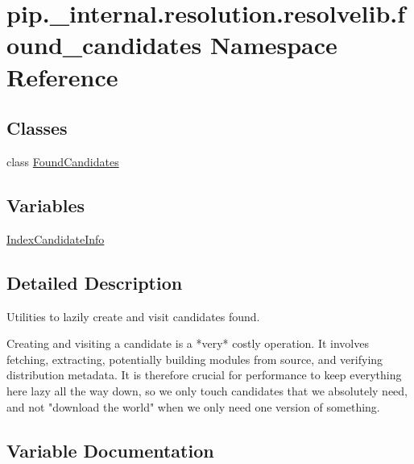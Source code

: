 \hypertarget{namespacepip_1_1__internal_1_1resolution_1_1resolvelib_1_1found__candidates}{}\section{pip.\+\_\+internal.\+resolution.\+resolvelib.\+found\+\_\+candidates Namespace Reference}
\label{namespacepip_1_1__internal_1_1resolution_1_1resolvelib_1_1found__candidates}
\subsection*{Classes}
\begin{DoxyCompactItemize}
\item 
class \hyperlink{classpip_1_1__internal_1_1resolution_1_1resolvelib_1_1found__candidates_1_1FoundCandidates}{Found\+Candidates}
\end{DoxyCompactItemize}
\subsection*{Variables}
\begin{DoxyCompactItemize}
\item 
\hyperlink{namespacepip_1_1__internal_1_1resolution_1_1resolvelib_1_1found__candidates_a5dc497406a3176c6265b8c383ee1ca94}{Index\+Candidate\+Info}
\end{DoxyCompactItemize}


\subsection{Detailed Description}
\begin{DoxyVerb}Utilities to lazily create and visit candidates found.

Creating and visiting a candidate is a *very* costly operation. It involves
fetching, extracting, potentially building modules from source, and verifying
distribution metadata. It is therefore crucial for performance to keep
everything here lazy all the way down, so we only touch candidates that we
absolutely need, and not "download the world" when we only need one version of
something.
\end{DoxyVerb}
 

\subsection{Variable Documentation}
\mbox{\label{namespacepip_1_1__internal_1_1resolution_1_1resolvelib_1_1found__candidates_a5dc497406a3176c6265b8c383ee1ca94}} 

